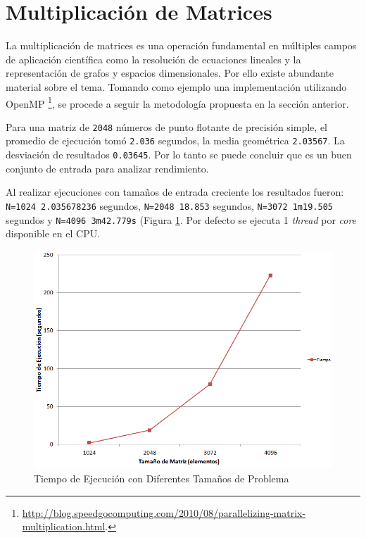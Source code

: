 \documentclass[a4paper]{report}
\begin{document}
\section{Multiplicación de Matrices}

La multiplicación de matrices es una operación fundamental en múltiples campos de aplicación científica como la resolución de ecuaciones lineales y la representación de grafos y espacios dimensionales. Por ello existe abundante material sobre el tema. Tomando como ejemplo una implementación utilizando OpenMP \footnote{\href{http://blog.speedgocomputing.com/2010/08/parallelizing-matrix-multiplication.html}{http://blog.speedgocomputing.com/2010/08/parallelizing-matrix-multiplication.html}.}, se procede a seguir la metodología propuesta en la sección anterior. 

\bigskip

Para una matriz de {\tt 2048} números de punto flotante de precisión simple, el promedio de ejecución tomó {\tt 2.036} segundos, la media geométrica {\tt 2.03567}. La desviación de resultados {\tt 0.03645}. Por lo tanto se puede concluir que es un buen conjunto de entrada para analizar rendimiento.

\bigskip

Al realizar ejecuciones con tamaños de entrada creciente los resultados fueron: {\tt N=1024 2.035678236} segundos, {\tt N=2048 18.853} segundos, {\tt N=3072 1m19.505} segundos y {\tt N=4096 3m42.779s} (Figura \ref{fig:matrix-problem}. 
Por defecto se ejecuta 1 {\it thread} por {\it core} disponible en el CPU.

\begin{figure}[H]
\centering
\includegraphics[width=\textwidth]{matrix-problem.png}
\caption{Tiempo de Ejecución con Diferentes Tamaños de Problema}
\label{fig:matrix-problem}
\end{figure}
\end{document}
